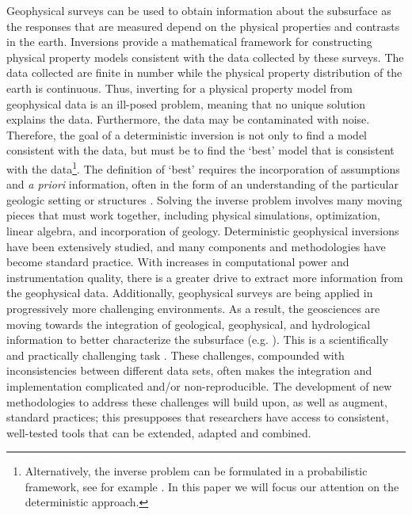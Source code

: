 \documentclass[preprint,review,3p,times,onecolumn,authoryear]{elsarticle}
\begin{document}
Geophysical surveys can be used to obtain information about the subsurface as the responses that are measured depend on the physical properties and contrasts in the earth. Inversions provide a mathematical framework for constructing physical property models consistent with the data collected by these surveys. The data collected are finite in number while the physical property distribution of the earth is continuous. Thus, inverting for a physical property model from geophysical data is an ill-posed problem, meaning that no unique solution explains the data. Furthermore, the data may be contaminated with noise. Therefore, the goal of a deterministic inversion is not only to find a model consistent with the data, but must be to find the `best' model that is consistent with the data\footnote{Alternatively, the inverse problem can be formulated in a probabilistic framework, see for example \citep{Tarantola2015,Tarantola1982}. In this paper we will focus our attention on the deterministic approach.}. The definition of `best' requires the incorporation of assumptions and \emph{a priori} information, often in the form of an understanding of the particular geologic setting or structures \citep{Constable1987, DougTutorial, lelievre2009integrating}. Solving the inverse problem involves many moving pieces that must work together, including physical simulations, optimization, linear algebra, and incorporation of geology. Deterministic geophysical inversions have been extensively studied, and many components and methodologies have become standard practice. With increases in computational power and instrumentation quality, there is a greater drive to extract more information from the geophysical data. Additionally, geophysical surveys are being applied in progressively more challenging environments. As a result, the geosciences are moving towards the integration of geological, geophysical, and hydrological information to better characterize the subsurface (e.g. \cite{ho,Doetsch2010,Gao2012}). This is a scientifically and practically challenging task \citep{Li2000a, lelievre2009integrating}. These challenges, compounded with inconsistencies between different data sets, often makes the integration and implementation complicated and/or non-reproducible. The development of new methodologies to address these challenges will build upon, as well as augment, standard practices; this presupposes that researchers have access to consistent, well-tested tools that can be extended, adapted and combined.
\end{document}
